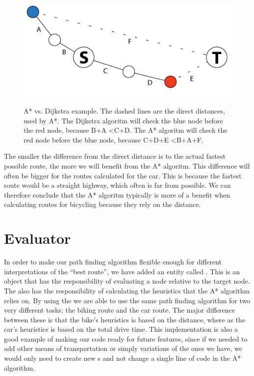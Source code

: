 \begin{figure}[!ht]
\centering
\includegraphics[width=1\linewidth]{images/AstarVSDijkstra.png}
\label{}
\caption{A* vs. Dijkstra example. The dashed lines are the direct distances,
used by A*. The Dijkstra algoritm will check the blue node before the red
node, because B+A \textless C+D. The A* algoritm will check the red node
before the blue node, because C+D+E \textless B+A+F.}
\end{figure}

The smaller the difference from the direct distance is to the actual fastest
possible route, the more we will benefit from the A* algoritm. This
difference will often be bigger for the routes calculated for the car. This is
because the fastest route would be a straight highway, which often is far from
possible. We can therefore conclude that the A* algoritm typically is more
of a benefit when calculating routes for bicycling because they rely on the
distance.

\section{Evaluator}
\label{IMPL-EVA}
In order to make our path finding algorithm flexible enough for different 
interpretations of the ``best route'', we have added an entity called . 
This is an object that has the responsibility of evaluating a node relative to 
the target node. The  also has the responsibility of calculating the 
heuristics that the A* algorithm relies on. By using the  we are able to 
use the same path finding algorithm for two very different tasks; the biking route and 
the car route. The major difference between these is that the bike's heuristics is based 
on the distance, where as the car's heuristics is based on the total drive time. This 
implementation is also a good example of making our code ready for future features, 
since if we needed to add other means of transportation or simply variations of the ones 
we have, we would only need to create new s and not change 
a single line of code in the A* algorithm.

